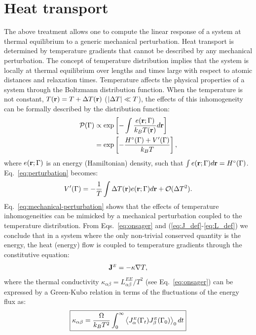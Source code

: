\section{Heat transport}  \label{sec:heat-transport}
The above treatment allows one to compute the linear response of a system at thermal equilibrium to a generic mechanical perturbation. Heat transport is determined by temperature gradients that cannot be described by any mechanical perturbation. The concept of temperature distribution implies that the system is locally at thermal equilibrium over lengths and times large with respect to atomic distances and relaxation times. Temperature affects the physical properties of a system through the Boltzmann distribution function. When the temperature is not constant, $T(\mathbf{r})=T+{\mathrm\Delta} T(\mathbf{r})$ ($|{\mathrm\Delta} T| \ll T$), the effects of this inhomogeneity can be formally described by the distribution function:
\begin{align}
  \mathcal{P}({\mathrm\Gamma}) & \propto
  \exp\left[ -\int \frac{e(\mathbf{r};{\mathrm\Gamma})}{k_BT(\mathbf{r})}d\mathbf{r} \right] \\
  &= \exp\left[ -\frac{H^\circ({\mathrm\Gamma})+V'({\mathrm\Gamma})}{k_BT} \right],
\end{align}
where $e(\mathbf{r};{\mathrm\Gamma})$ is an energy (Hamiltonian) density, such that $\int e(\mathbf{r};{\mathrm\Gamma}) d\mathbf{r} = H^\circ({\mathrm\Gamma})$. Eq.~\eqref{eq:perturbation} becomes:
\begin{equation}
   V'(\rGamma)=-\frac{1}{T}\int\rDelta T(\mathbf{r})e(\mathbf{r};\rGamma) d\mathbf{r} + \mathcal{O}(\rDelta T^2) . \label{eq:mechanical-perturbation}
\end{equation}
Eq.~\eqref{eq:mechanical-perturbation} shows that the effects of temperature inhomogeneities can be mimicked by a mechanical perturbation coupled to the temperature distribution. From Eqs.~\eqref{eq:onsager} and (\ref{eq:J_def}-\ref{eq:L_def}) we conclude that in a system where the only non-trivial conserved quantity is the energy, the heat (energy) flow is coupled to temperature gradients through the constitutive equation:
\begin{equation}
  \mathbf{J}^\smallE = - \kappa \nabla T, \label{eq:thermal-constitutive}
\end{equation}
where the thermal conductivity $\kappa_{\alpha\beta}= L^{\scriptscriptstyle EE}_{\alpha \beta} / T^2$ (see Eq.~\eqref{eq:onsager}) can be expressed by a Green-Kubo relation in terms of the fluctuations of the energy flux as:
\begin{equation}
  \boxed{ \kappa_{\alpha\beta} =\frac{\rOmega}{k_B T^2} \int_0^\infty \left \langle J^\smallE_\alpha(\rGamma_t) J^\smallE_\beta(\rGamma_0) \right \rangle_0 dt } \label{eq:GK-complete}
\end{equation}
